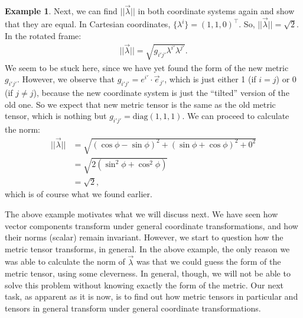 \documentclass{book}
\theoremstyle{definition}
\newtheorem{exmp}{Example}[section]
\begin{document}
\begin{exmp}
	Next, we can find $\vert\vert \vec{\lambda} \vert\vert$ in both coordinate systems again and show that they are equal. In Cartesian coordinates, $\{\lambda^i\} = (1,1,0)^\top$. So, $\vert\vert \vec{\lambda} \vert\vert = \sqrt{2}$. In the rotated frame:
	\begin{align*}
	\vert\vert\vec{\lambda}\vert\vert = \sqrt{g_{i'j'}\lambda^{i'}\lambda^{j'}}.
	\end{align*}
	We seem to be stuck here, since we have yet found the form of the new metric $g_{i'j'}$. However, we observe that $g_{i'j'} = e^{i'}\cdot\vec{e}_{j'}$, which is just either 1 (if $i=j$) or 0 (if $j\neq j$), because the new coordinate system is just the ``tilted'' version of the old one. So we expect that new metric tensor is the same as the old metric tensor, which is nothing but $g_{i'j'}=\text{diag}(1,1,1)$. We can proceed to calculate the norm:
	\begin{align*}
	\vert\vert\vec{\lambda}\vert\vert &= \sqrt{\left( \cos\phi - \sin\phi \right)^2 + \left( \sin\phi + \cos\phi \right)^2 + 0^2}\\
	&= \sqrt{2\left(\sin^2\phi + \cos^2\phi\right) }\\
	&= \sqrt{2},
	\end{align*}
	which is of course what we found earlier. 
\end{exmp}
The above example motivates what we will discuss next. We have seen how vector components transform under general coordinate transformations, and how their norms (scalar) remain invariant. However, we start to question how the metric tensor transforms, in general. In the above example, the only reason we was able to calculate the norm of $\vec{\lambda}$ was that we could guess the form of the metric tensor, using some cleverness. In general, though, we will not be able to solve this problem without knowing exactly the form of the metric. Our next task, as apparent as it is now, is to find out how metric tensors in particular and tensors in general transform under general coordinate transformations. 
\end{document}
